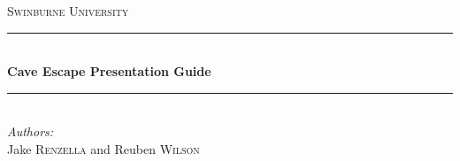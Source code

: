 \documentclass[12pt]{article}
\begin{document}
\begin{titlepage}
\newcommand{\HRule}{\rule{\linewidth}{0.5mm}} %

\center %
\textsc{\LARGE Swinburne University}\\[1.5cm] %

\HRule \\[0.4cm]
{ \huge \bfseries Cave Escape Presentation Guide}\\[0.4cm] %
\HRule \\[1.5cm]

\Large \emph{Authors:}\\
Jake \textsc{Renzella} and Reuben \textsc{Wilson}\\[1cm] %


\end{titlepage}
\end{document}
